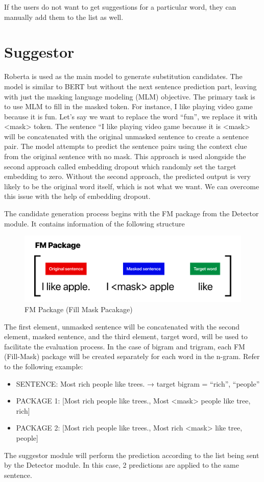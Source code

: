 \documentclass[12pt,oneside,openright,a4paper]{cpe-english-project}
\begin{document}
If the users do not want to get suggestions for a particular word, they can manually add them to the list as well. 



\section{Suggestor}
Roberta is used as the main model to generate substitution candidates. The model is similar to BERT but without the next sentence prediction part, leaving with just the masking language modeling (MLM) objective. The primary task is to use MLM to fill in the masked token. For instance, I like playing video game because it is fun. Let’s say we want to replace the word “fun”, we replace it with <mask> token. The sentence “I like playing video game because it is <mask> will be concatenated with the original unmasked sentence to create a sentence pair. The model attempts to predict the sentence pairs using the context clue from the original sentence with no mask. This approach is used alongside the second approach called embedding dropout which randomly set the target embedding to zero. Without the second approach, the predicted output is very likely to be the original word itself, which is not what we want. We can overcome this issue with the help of embedding dropout.


The candidate generation process begins with the FM package from the Detector module. It contains information of the following structure
\begin{figure}[!h]\centering
\includegraphics[width=15cm]{./img/chp3/Package.png}
\caption{FM Package (Fill Mask Pacakage)}\label{fig:FMPX}
\end{figure}
The first element, unmasked sentence will be concatenated with the second element, masked sentence, and the third element, target word, will be used to facilitate the evaluation process. In the case of bigram and trigram, each FM (Fill-Mask) package will be created separately for each word in the n-gram. Refer to the following example:
\begin{itemize}
\item SENTENCE: Most rich people like trees. → target bigram = “rich”, “people”
\item PACKAGE 1: [Most rich people like trees., Most <mask> people like tree, rich]
\item PACKAGE 2: [Most rich people like trees., Most rich <mask> like tree, people]
\end{itemize}
The suggestor module will perform the prediction according to the list being sent by the Detector module. In this case, 2 predictions are applied to the same sentence.
\end{document}
